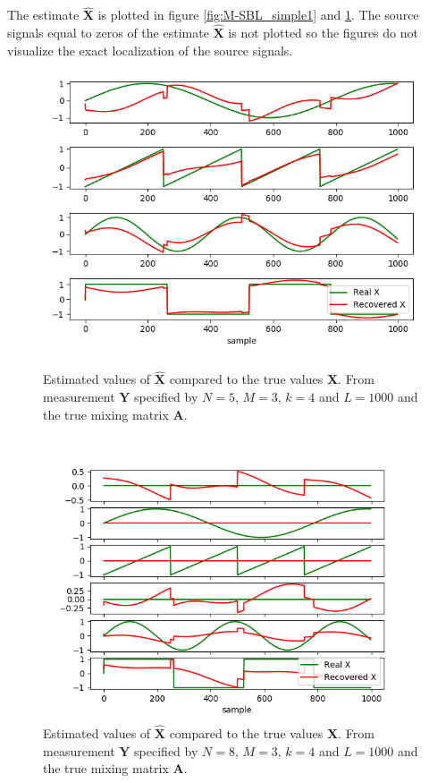 The estimate $\hat{\mathbf{X}}$ is plotted in figure \ref{fig:M-SBL_simple1} and \ref{fig:M-SBL_simple2}. The source signals equal to zeros of the estimate $\hat{\mathbf{X}}$ is not plotted so the figures do not visualize the exact localization of the source signals.
\begin{figure}[H]
    \begin{minipage}[t]{.45\textwidth}
    	\centering
		\includegraphics[scale=0.5]{figures/ch_6/M-SBL_simple1.png}
		\caption{Estimated values of $\hat{\mathbf{X}}$ compared to the true 					values $\mathbf{X}$. From measurement $\mathbf{Y}$ specified by $N=5$, $M = 3$, $k=4$ and $L=1000$ and the true mixing matrix $\mathbf{A}$.}
		\label{fig:M-SBL_simple1}
    \end{minipage} 
    \hfill
    \begin{minipage}[t]{.45\textwidth}
        \centering
		\includegraphics[scale=0.5]{figures/ch_6/M-SBL_simple2.png}
		\caption{Estimated values of $\hat{\mathbf{X}}$ compared to the true 				values $\mathbf{X}$. From measurement $\mathbf{Y}$ specified by $N=8$, $M = 3$, $k=4$ and $L=1000$ and the true mixing matrix $\mathbf{A}$.}
		\label{fig:M-SBL_simple2}
    \end{minipage}
\end{figure}
